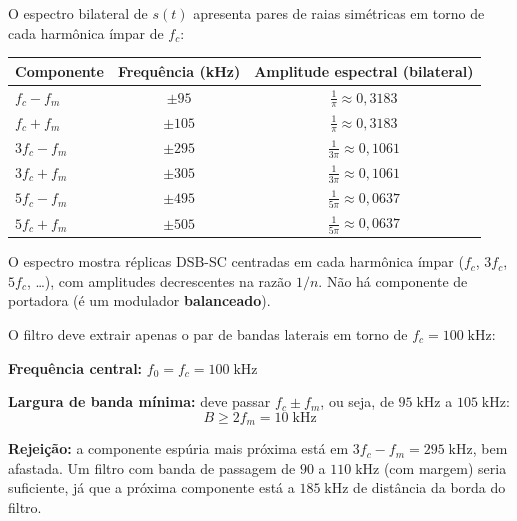 \documentclass[11pt,a4paper]{article}
\begin{document}
\begin{resolucao}

O espectro bilateral de $s(t)$ apresenta pares de raias simétricas em torno de cada harmônica ímpar de $f_c$:

\begin{center}
\small
\begin{tabular}{lcc}
  \toprule
  Componente & Frequência (kHz) & Amplitude espectral (bilateral) \\
  \midrule
  $f_c - f_m$ & $\pm 95$ & $\frac{1}{\pi} \approx 0{,}3183$ \\[3pt]
  $f_c + f_m$ & $\pm 105$ & $\frac{1}{\pi} \approx 0{,}3183$ \\[3pt]
  $3f_c - f_m$ & $\pm 295$ & $\frac{1}{3\pi} \approx 0{,}1061$ \\[3pt]
  $3f_c + f_m$ & $\pm 305$ & $\frac{1}{3\pi} \approx 0{,}1061$ \\[3pt]
  $5f_c - f_m$ & $\pm 495$ & $\frac{1}{5\pi} \approx 0{,}0637$ \\[3pt]
  $5f_c + f_m$ & $\pm 505$ & $\frac{1}{5\pi} \approx 0{,}0637$ \\
  \bottomrule
\end{tabular}
\end{center}

O espectro mostra réplicas DSB-SC centradas em cada harmônica ímpar ($f_c$, $3f_c$, $5f_c$, \ldots), com amplitudes decrescentes na razão $1/n$. Não há componente de portadora (é um modulador \textbf{balanceado}).
\end{resolucao}

\begin{resolucao}

O filtro deve extrair apenas o par de bandas laterais em torno de $f_c = 100\;\text{kHz}$:

\textbf{Frequência central:} $f_0 = f_c = 100\;\text{kHz}$

\textbf{Largura de banda mínima:} deve passar $f_c \pm f_m$, ou seja, de $95\;\text{kHz}$ a $105\;\text{kHz}$:
\[
  \boxed{B \geq 2f_m = 10\;\text{kHz}}
\]

\textbf{Rejeição:} a componente espúria mais próxima está em $3f_c - f_m = 295\;\text{kHz}$, bem afastada. Um filtro com banda de passagem de $90$ a $110\;\text{kHz}$ (com margem) seria suficiente, já que a próxima componente está a $185\;\text{kHz}$ de distância da borda do filtro.
\end{resolucao}
\end{document}
